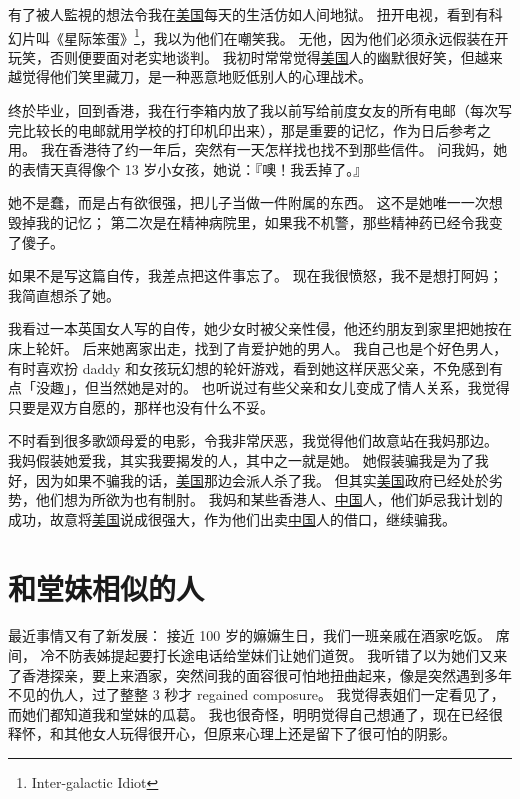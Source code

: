 \documentclass[12pt]{report}
\begin{document}

有了被人監視的想法令我在\underline{美国}每天的生活仿如人间地狱。  扭开电视，看到有科幻片叫《星际笨蛋》\footnote{Inter-galactic Idiot}，我以为他们在嘲笑我。  无他，因为他们必须永远假装在开玩笑，否则便要面对老实地谈判。  我初时常常觉得\underline{美国}人的幽默很好笑，但越来越觉得他们笑里藏刀，是一种恶意地贬低别人的心理战术。

终於毕业，回到香港，我在行李箱内放了我以前写给前度女友的所有电邮（每次写完比较长的电邮就用学校的打印机印出来），那是重要的记忆，作为日后参考之用。 我在香港待了约一年后，突然有一天怎样找也找不到那些信件。 问我妈，她的表情天真得像个 13 岁小女孩，她说：『噢！我丢掉了。』

她不是蠢，而是占有欲很强，把儿子当做一件附属的东西。  这不是她唯一一次想毁掉我的记忆； 第二次是在精神病院里，如果我不机警，那些精神药已经令我变了傻子。

如果不是写这篇自传，我差点把这件事忘了。  现在我很愤怒，我不是想打阿妈； 我简直想杀了她。 

我看过一本英国女人写的自传，她少女时被父亲性侵，他还约朋友到家里把她按在床上轮奸。 后来她离家出走，找到了肯爱护她的男人。 我自己也是个好色男人，有时喜欢扮 daddy 和女孩玩幻想的轮奸游戏，看到她这样厌恶父亲，不免感到有点「没趣」，但当然她是对的。  也听说过有些父亲和女儿变成了情人关系，我觉得只要是双方自愿的，那样也没有什么不妥。

不时看到很多歌颂母爱的电影，令我非常厌恶，我觉得他们故意站在我妈那边。 我妈假装她爱我，其实我要揭发的人，其中之一就是她。  她假装骗我是为了我好，因为如果不骗我的话，\underline{美国}那边会派人杀了我。 但其实\underline{美国}政府已经处於劣势，他们想为所欲为也有制肘。 我妈和某些香港人、\underline{中国}人，他们妒忌我计划的成功，故意将\underline{美国}说成很强大，作为他们出卖\underline{中国}人的借口，继续骗我。

\chapter{和堂妹相似的人}

最近事情又有了新发展：  接近 100 岁的嫲嫲生日，我们一班亲戚在酒家吃饭。  席间， 冷不防表姊提起要打长途电话给堂妹们让她们道贺。  我听错了以为她们又来了香港探亲，要上来酒家，突然间我的面容很可怕地扭曲起来，像是突然遇到多年不见的仇人，过了整整 3 秒才 regained composure。 我觉得表姐们一定看见了，而她们都知道我和堂妹的瓜葛。  我也很奇怪，明明觉得自己想通了，现在已经很释怀，和其他女人玩得很开心，但原来心理上还是留下了很可怕的阴影。
\end{document}
